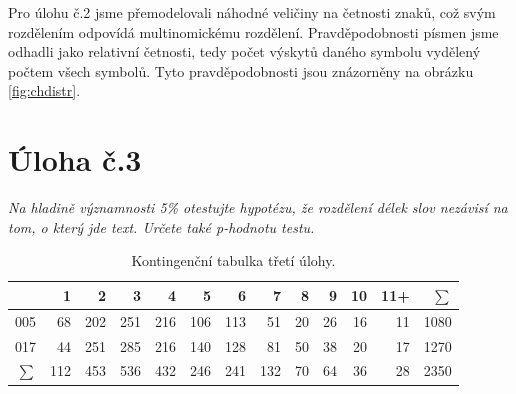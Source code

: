 \documentclass[czech]{mvi-report}
\begin{document}
Pro úlohu č.2 jsme přemodelovali náhodné veličiny na četnosti znaků, což svým rozdělením odpovídá multinomickému rozdělení. Pravděpodobnosti písmen jsme odhadli jako relativní četnosti, tedy počet výskytů daného symbolu vydělený počtem všech symbolů. Tyto pravděpodobnosti jsou znázorněny na obrázku \ref{fig:chdistr}.

\section{Úloha č.3}
\textit{Na hladině významnosti 5\% otestujte hypotézu, že rozdělení délek slov nezávisí na tom, o který jde text. Určete také p-hodnotu testu.}\\
\begin{table}[t]
\centering
\caption{Kontingenční tabulka třetí úlohy.}
\begin{tabular}{|r|rrrrrrrrrrr|r|} 
\hline
   & \multicolumn{1}{r|}{1} & \multicolumn{1}{r|}{2} & \multicolumn{1}{r|}{3} & \multicolumn{1}{r|}{4} & \multicolumn{1}{r|}{5} & \multicolumn{1}{r|}{6} & \multicolumn{1}{r|}{7} & \multicolumn{1}{r|}{8} & \multicolumn{1}{r|}{9} & \multicolumn{1}{r|}{10} & \multicolumn{1}{r|}{11+}  &$ \sum $       \\ 
\hline
005 & 68                     & 202                    & 251                    & 216                    & 106                    & 113                    & 51                     & 20                     & 26                     & 16                      & 11                         & 1080  \\
017 & 44                     & 251                    & 285                    & 216                    & 140                    & 128                    & 81                     & 50                     & 38                     & 20                      & 17                         & 1270  \\ 
\hline
  $ \sum $  & 112                    & 453                    & 536                    & 432                    & 246                    & 241                    & 132                    & 70                     & 64                     & 36                      & 28  & 2350  \\
\hline
\end{tabular}
\label{tab:3}
\end{table}
\end{document}
